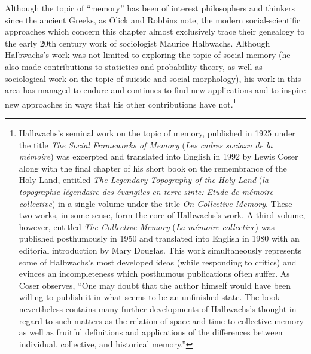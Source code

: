 Although the topic of ``memory'' has been of interest philosophers and
thinkers since the ancient Greeks, as Olick and Robbins note, the modern
social-scientific approaches which concern this chapter almost
exclusively trace their genealogy to the early 20th century work of
sociologist Maurice Halbwachs.\autocites[106]{olick-robbins_ars1998}[It
should be noted, however, that Halbwachs was not the first or only
person to do work on memory or the impact of society thereon, despite
most recent literature's preoccupation with him,
see][8--36]{olick_olick-etal2011} Although Halbwachs's work was not
limited to exploring the topic of social memory (he also made
contributions to statictics and probability theory, as well as
sociological work on the topic of suicide and social
morphology\autocite[13--20]{coser_halbwachs1992}), his work in this area
has managed to endure and continues to find new applications and to
inspire new approaches in ways that his other contributions have
not.\footnote{Halbwachs's seminal work on the topic of memory, published
  in 1925 under the title \emph{The Social Frameworks of Memory}
  (\emph{Les cadres sociaxu de la mémoire}) was excerpted and translated
  into English in 1992 by Lewis Coser along with the final chapter of
  his short book on the remembrance of the Holy Land, entitled \emph{The
  Legendary Topography of the Holy Land} (\emph{la topographie
  légendaire des évangiles en terre sinte: Etude de mémoire collective})
  in a single volume under the title \emph{On Collective
  Memory}.\autocite{halbwachs1992} These two works, in some sense, form
  the core of Halbwachs's work. A third volume, however, entitled
  \emph{The Collective Memory} (\emph{La mémoire collective}) was
  published posthumously in 1950 and translated into English in 1980
  with an editorial introduction by Mary
  Douglas.\autocite{halbwachs1980} This work simultaneously represents
  some of Halbwachs's most developed ideas (while responding to critics)
  and evinces an incompleteness which posthumous publications often
  suffer. As Coser observes, ``One may doubt that the author himself
  would have been willing to publish it in what seems to be an
  unfinished state. The book nevertheless contains many further
  developments of Halbwachs's thought in regard to such matters as the
  relation of space and time to collective memory as well as fruitful
  definitions and applications of the differences between individual,
  collective, and historical memory.''\autocite{coser_halbwachs1992}}

